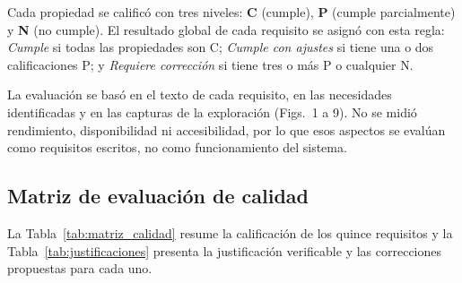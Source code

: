 \documentclass[12pt,a4paper]{article}
\renewcommand{\arraystretch}{1.17}
\begin{document}
Cada propiedad se calificó con tres niveles: \textbf{C}
(cumple), \textbf{P} (cumple parcialmente) y \textbf{N}
(no cumple). El resultado global de cada requisito se asignó
con esta regla: \emph{Cumple} si todas las propiedades son C;
\emph{Cumple con ajustes} si tiene una o dos calificaciones P;
y \emph{Requiere corrección} si tiene tres o más P o
cualquier N.

La evaluación se basó en el texto de cada requisito, en las
necesidades identificadas y en las capturas de la exploración
(Figs.~1 a 9). No se midió rendimiento,
disponibilidad ni accesibilidad, por lo que esos aspectos se
evalúan como requisitos escritos, no como funcionamiento del
sistema.

\subsection{Matriz de evaluación de calidad}

La Tabla~\ref{tab:matriz_calidad} resume la calificación de
los quince requisitos y la Tabla~\ref{tab:justificaciones}
presenta la justificación verificable y las correcciones
propuestas para cada uno.

\begingroup
\footnotesize
\setlength{\tabcolsep}{2.5pt}
\renewcommand{\arraystretch}{1.15}
\end{document}

